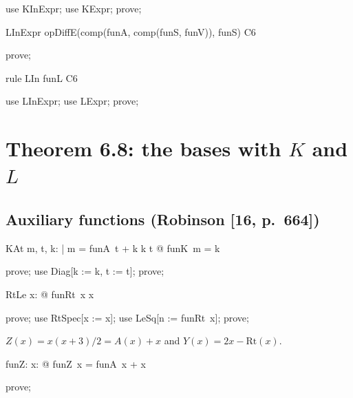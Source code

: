 \documentclass{article}
\begin{document}
\begin{zproof}
use KInExpr;
use KExpr;
prove;
\end{zproof}
\begin{theorem}{LInExpr}
  opDiffE(comp(funA, comp(funS, funV)), funS) \in C6
\end{theorem}

\begin{zproof}
prove;
\end{zproof}

\begin{theorem}{rule LIn}
  funL \in C6
\end{theorem}

\begin{zproof}
use LInExpr;
use LExpr;
prove;
\end{zproof}

\section{Theorem 6.8: the bases with $K$ and $L$}

\subsection{Auxiliary functions (Robinson [16, p.~664])}

\begin{theorem}{KAt}
  \forall m, t, k: \nat | m = funA~t + k \land k \leq t @ funK~m = k
\end{theorem}

\begin{zproof}
prove;
use Diag[k := k, t := t];
prove;
\end{zproof}

\begin{theorem}{RtLe}
  \forall x: \nat @ funRt~x \leq x
\end{theorem}

\begin{zproof}
prove;
use RtSpec[x := x];
use LeSq[n := funRt~x];
prove;
\end{zproof}

$Z(x) = x(x+3)/2 = A(x) + x$ and $Y(x) = 2x - \mathrm{Rt}(x)$.

\begin{axdef}
  funZ: \nat \fun \nat
\where
   \forall x: \nat @ funZ~x = funA~x + x
\end{axdef}

\begin{zproof}
prove;
\end{zproof}
\end{document}
